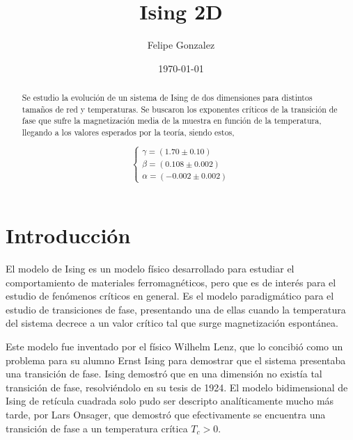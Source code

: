 \documentclass[
 reprint,
 amsmath,amssymb,
 aps,
]{revtex4-1}
\begin{document}

\title{Ising 2D}

\author{Felipe Gonzalez}


\date{\today}

\begin{abstract}
Se estudio la evoluci\'on de un sistema de Ising de dos dimensiones para
distintos tama\~nos de red y temperaturas. Se buscaron los exponentes cr\'iticos
de la transici\'on de fase que sufre la magnetizaci\'on media de la muestra en
funci\'on de la temperatura, llegando a los valores esperados por la teor\'ia,
siendo estos,

$$
\left \{
  \begin{matrix}
    \gamma = (1.70 \pm 0.10) \\
    \beta = (0.108 \pm 0.002) \\
    \alpha = (-0.002 \pm 0.002)
  \end{matrix}
\right.
$$

\end{abstract}


\maketitle

\section{Introducci\'on}

El modelo de Ising es un modelo f\'isico desarrollado para estudiar el
comportamiento de materiales ferromagnéticos, pero que es de inter\'es para el
estudio de fen\'omenos cr\'iticos en general. Es el modelo paradigm\'atico para
el estudio de transiciones de fase, presentando una de ellas cuando la
temperatura del sistema decrece a un valor cr\'itico tal que surge
magnetizaci\'on espont\'anea.

Este modelo fue inventado por el f\'isico Wilhelm Lenz, que lo concibió
como un problema para su alumno Ernst Ising para demostrar que el sistema
presentaba una transici\'on de fase. Ising demostró que en una dimensión
no existía tal transici\'on de fase, resolviéndolo en su tesis de 1924. El modelo
bidimensional de Ising de retícula cuadrada solo pudo ser descripto
analíticamente mucho más tarde, por Lars Onsager, que demostró que
efectivamente se encuentra una transici\'on de fase a un temperatura cr\'itica
$T_c > 0$\cite{Onsager}.
\end{document}
